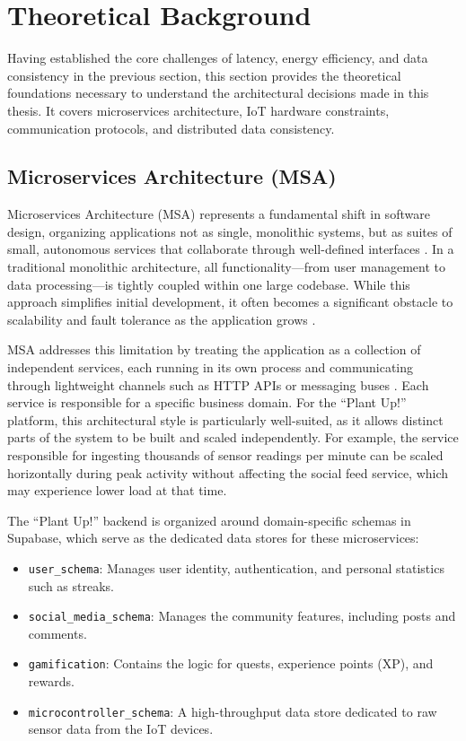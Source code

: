 ﻿\section{Theoretical Background}

Having established the core challenges of latency, energy efficiency, and data consistency in the previous section, this section provides the theoretical foundations necessary to understand the architectural decisions made in this thesis. It covers microservices architecture, IoT hardware constraints, communication protocols, and distributed data consistency.

\subsection{Microservices Architecture (MSA)}
Microservices Architecture (MSA) represents a fundamental shift in software design, organizing applications not as single, monolithic systems, but as suites of small, autonomous services that collaborate through well-defined interfaces \cite{awsMicroservices}. In a traditional monolithic architecture, all functionality---from user management to data processing---is tightly coupled within one large codebase. While this approach simplifies initial development, it often becomes a significant obstacle to scalability and fault tolerance as the application grows \cite{fowlerMicroservices}.

MSA addresses this limitation by treating the application as a collection of independent services, each running in its own process and communicating through lightweight channels such as HTTP APIs or messaging buses \cite{newmanBuilding}. Each service is responsible for a specific business domain. For the ``Plant Up!'' platform, this architectural style is particularly well-suited, as it allows distinct parts of the system to be built and scaled independently. For example, the service responsible for ingesting thousands of sensor readings per minute can be scaled horizontally during peak activity without affecting the social feed service, which may experience lower load at that time.

The ``Plant Up!'' backend is organized around domain-specific schemas in Supabase, which serve as the dedicated data stores for these microservices:
\begin{itemize}
    \item \texttt{user\_schema}: Manages user identity, authentication, and personal statistics such as streaks.
    \item \texttt{social\_media\_schema}: Manages the community features, including posts and comments.
    \item \texttt{gamification}: Contains the logic for quests, experience points (XP), and rewards.
    \item \texttt{microcontroller\_schema}: A high-throughput data store dedicated to raw sensor data from the IoT devices.
\end{itemize}


